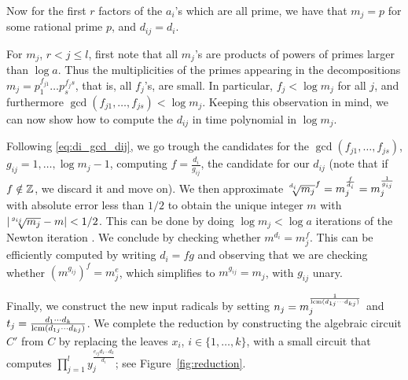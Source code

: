 Now for the first $r$ factors of the $a_i$'s which are all prime, we have that $m_j = p$ for some rational prime $p$, and $d_{ij} = d_i$.

For $m_j$, $r < j \leq l$, first note that all $m_j$'s are products of powers of primes larger than $\log a$. Thus the multiplicities of the primes appearing in the decompositions $m_j= p_1^{f_{j1}} \ldots p_s^{f_js}$, that is, all $f_{j}$'s, are small. In particular, $f_{j} < \log m_j$ for all $j$, and furthermore $\gcd(f_{j1},\ldots,f_{js}) < \log m_j$.  Keeping this observation in mind, we can now show how to compute the $d_{ij}$ in time polynomial in $\log m_j$.
    
 Following \eqref{eq:di_gcd_dij}, we go trough the candidates for the $\gcd(f_{j1},\ldots,f_{js})$, $g_{ij} = 1,\ldots,\log m_j-1$, computing $f = \frac{d_i}{g_{ij}}$, the candidate for our $d_{ij}$ (note that if $f\notin\mathbb{Z}$, we discard it and move on). We then approximate $\mysqrt{d_i}{m_j}^f = m_j^{\frac{f}{d_i}} = m_j ^ {\frac{1}{g_{ij}}}$ with absolute error less than $1/2$ to obtain the unique integer $m$ with $|\mysqrt{g_{ij}}{m_j} - m| < 1/2$. This can be done by doing $\log m_j < \log a$ iterations of the Newton iteration \cite[Lemma~3.1]{Brent2016}. 
 We conclude by checking whether $m ^{d_i} = m_j^f$. This can be efficiently computed by writing $d_i = fg$ and observing that we are checking whether $(m^{g_{ij}})^f = m_j ^ e$, which simplifies to $m^{g_{ij} }=m_j$, with $g_{ij}$ unary.

Finally, we construct the new input radicals by setting $n_j = m_j ^{\frac{1}{\operatorname{lcm}(d_{1j}\cdots d_{kj})}}$ and $t_j = \frac{d_1\cdots d_k}{\operatorname{lcm}(d_{1j} \cdots d_{kj})}$.
We complete the reduction by constructing the algebraic circuit $C'$ from $C$ by replacing the leaves $x_i$, $i\in \{1,\ldots,k\}$, with a small circuit that computes $\prod_{j=1}^{l} y_j^{\frac{e_{ij}d_1\cdots d_k}{d_i}}$;
see Figure~\ref{fig:reduction}.

